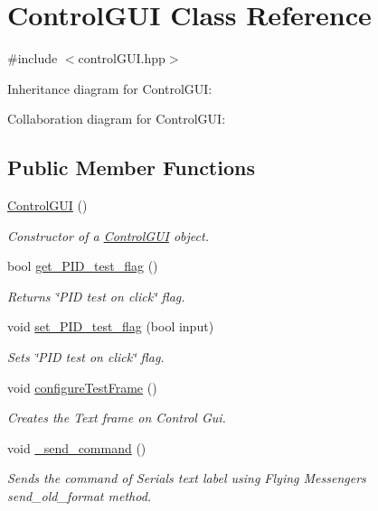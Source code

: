 \hypertarget{class_control_g_u_i}{}\section{Control\+G\+UI Class Reference}
\label{class_control_g_u_i}


{\ttfamily \#include $<$control\+G\+U\+I.\+hpp$>$}



Inheritance diagram for Control\+G\+UI\+:


Collaboration diagram for Control\+G\+UI\+:
\subsection*{Public Member Functions}
\begin{DoxyCompactItemize}
\item 
\hyperlink{class_control_g_u_i_a3ac837dec598621fcdd71fd64ff013fd}{Control\+G\+UI} ()
\begin{DoxyCompactList}\small\item\em Constructor of a \hyperlink{class_control_g_u_i}{Control\+G\+UI} object. \end{DoxyCompactList}\item 
bool \hyperlink{class_control_g_u_i_a7374bda9d4cf28b1374760c82f5f684c}{get\+\_\+\+P\+I\+D\+\_\+test\+\_\+flag} ()
\begin{DoxyCompactList}\small\item\em Returns \char`\"{}\+P\+I\+D test on click\char`\"{} flag. \end{DoxyCompactList}\item 
void \hyperlink{class_control_g_u_i_abe424a7edef9b3a15cdc8a2b2324120a}{set\+\_\+\+P\+I\+D\+\_\+test\+\_\+flag} (bool input)
\begin{DoxyCompactList}\small\item\em Sets \char`\"{}\+P\+I\+D test on click\char`\"{} flag. \end{DoxyCompactList}\item 
void \hyperlink{class_control_g_u_i_a3bd87790c510afe1eb2fe7e33474d145}{configure\+Test\+Frame} ()
\begin{DoxyCompactList}\small\item\em Creates the Text frame on Control Gui. \end{DoxyCompactList}\item 
void \hyperlink{class_control_g_u_i_a26002e2fa3dd7bcac791f54276670004}{\+\_\+send\+\_\+command} ()
\begin{DoxyCompactList}\small\item\em Sends the command of Serial\textquotesingle{}s text label using Flying Messenger\textquotesingle{}s send\+\_\+old\+\_\+format method. \end{DoxyCompactList}\item 

\end{DoxyCompactItemize}
